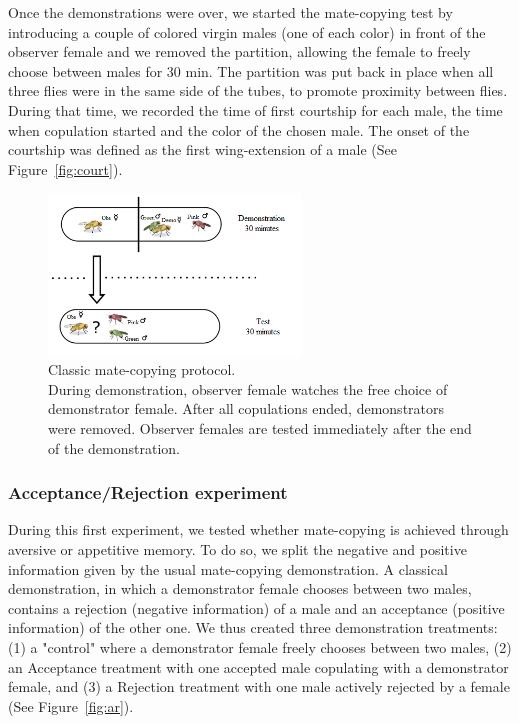 \documentclass[a4paper, 12pt]{article}
\begin{document}
	Once the demonstrations were over, we started the mate-copying test by introducing a couple of colored virgin males (one of each color) in front of the observer female and we removed the partition, allowing the female to freely choose between males for 30 min. The partition was put back in place when all three flies were in the same side of the tubes, to promote proximity between flies. During that time, we recorded the time of first courtship for each male, the time when copulation started and the color of the chosen male. The onset of the courtship was defined as the first wing-extension of a male (See Figure~\ref{fig:court}).
	
	

	\begin{figure}
	\centering
	\includegraphics[width=0.6\textwidth]{images/classic}
	\caption{Classic mate-copying protocol.\\ 
		During demonstration, observer female watches the free choice of demonstrator female. After all copulations ended, demonstrators were removed. Observer females are tested immediately after the end of the demonstration.}
	\label{fig:classic}
\end{figure}

	\subsubsection{Acceptance/Rejection experiment}
	
	During this first experiment, we tested whether mate-copying is achieved through aversive or appetitive memory. To do so, we split the negative and positive information given by the usual mate-copying demonstration. A classical demonstration, in which a demonstrator female chooses between two males, contains a rejection (negative information) of a male and an acceptance (positive information) of the other one. We thus created three demonstration treatments: (1) a "control" where a demonstrator female freely chooses between two males, (2) an Acceptance treatment with one accepted male copulating with a demonstrator female, and (3) a Rejection treatment with one male actively rejected by a female (See Figure~\ref{fig:ar}).
	
\end{document}
